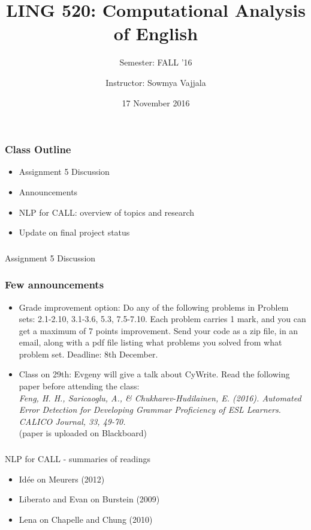 \documentclass{beamer}
\author[Sowmya Vajjala]{Instructor: Sowmya Vajjala}
\title[LING 520]{LING 520: Computational Analysis of English}
\subtitle{Semester: FALL '16}
\date{17 November 2016}
\institute{Iowa State University, USA}
\begin{document}
\begin{frame}\titlepage
\end{frame}

\begin{frame}
\frametitle{Class Outline}
\begin{itemize}
\item Assignment 5 Discussion
\item Announcements
\item NLP for CALL: overview of topics and research
\item Update on final project status
\end{itemize}
\end{frame}

\begin{frame} %
\frametitle{}
\Large Assignment 5 Discussion
\end{frame}

\begin{frame} %
\frametitle{Few announcements}
\begin{itemize}
\item Grade improvement option: Do any of the following problems in Problem sets: 2.1-2.10, 3.1-3.6, 5.3, 7.5-7.10. Each problem carries 1 mark, and you can get a maximum of 7 points improvement. Send your code as a zip file, in an email, along with a pdf file listing what problems you solved from what problem set. Deadline: 8th December. \pause
\item Class on 29th: Evgeny will give a talk about CyWrite. Read the following paper before attending the class:
\\ \textit{Feng, H. H., Saricaoglu, A., \& Chukharev-Hudilainen, E. (2016). Automated Error Detection for Developing Grammar Proficiency of ESL Learners. CALICO Journal, 33, 49-70.}
\\ (paper is uploaded on Blackboard) \pause
\end{itemize}
\end{frame}

\begin{frame}
\frametitle{}
\Large NLP for CALL - summaries of readings
\begin{itemize}
\item Id\'{e}e on Meurers (2012)
\item Liberato and Evan on Burstein (2009)
\item Lena on Chapelle and Chung (2010)
\end{itemize}
\end{frame}
\end{document}
